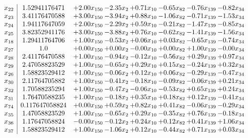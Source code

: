 \documentclass[8pt]{article}
\begin{document}
\[\begin{array}{c| c c@{\hskip 2pt} c@{\hskip 2pt} c@{\hskip 2pt} c@{\hskip 2pt} c@{\hskip 2pt} c@{\hskip 2pt} }
 x_{22}   &  1.52941176471 & +  2.00 x_{150} & -2.35 x_{2} & +  0.71 x_{10} & -0.65 x_{82} & -0.76 x_{139} & -0.82 x_{34}\\
 x_{23}   &  3.41176470588 & +  3.00 x_{150} & -3.94 x_{2} & +  0.88 x_{10} & -1.06 x_{82} & -0.71 x_{139} & -1.53 x_{34}\\
 x_{24}   &  1.94117647059 & +  2.00 x_{150} & -2.29 x_{2} & +  0.59 x_{10} & -0.21 x_{82} & -1.47 x_{139} & -0.85 x_{34}\\
 x_{25}   &  3.82352941176 & +  3.00 x_{150} & -3.88 x_{2} & +  0.76 x_{10} & -0.62 x_{82} & -1.41 x_{139} & -1.56 x_{34}\\
 x_{18}   &  1.29411764706 & +  1.00 x_{150} & -0.53 x_{2} & +  0.06 x_{10} & +  0.03 x_{82} & -0.65 x_{139} & -0.74 x_{34}\\
 x_{27}   &  1.0 & +  0.00 x_{150} & +  0.00 x_{2} & -0.00 x_{10} & +  0.00 x_{82} & +  1.00 x_{139} & -0.00 x_{34}\\
 x_{28}   &  2.41176470588 & +  1.00 x_{150} & -0.94 x_{2} & -0.12 x_{10} & -0.56 x_{82} & +  0.29 x_{139} & +  0.97 x_{34}\\
 x_{29}   &  2.47058823529 & +  1.00 x_{150} & -0.65 x_{2} & +  0.29 x_{10} & +  0.15 x_{82} & -0.24 x_{139} & +  0.32 x_{34}\\
 x_{26}   &  1.58823529412 & +  1.00 x_{150} & -0.06 x_{2} & +  0.12 x_{10} & +  0.06 x_{82} & -0.29 x_{139} & -0.47 x_{34}\\
 x_{30}   &  2.11764705882 & +  1.00 x_{150} & -0.41 x_{2} & -0.18 x_{10} & -0.09 x_{82} & -0.06 x_{139} & +  0.21 x_{34}\\
 x_{32}   &  1.70588235294 & +  1.00 x_{150} & -0.47 x_{2} & -0.06 x_{10} & -0.53 x_{82} & +  0.65 x_{139} & +  0.24 x_{34}\\
 x_{31}   &  1.76470588235 & +  1.00 x_{150} & -0.18 x_{2} & +  0.35 x_{10} & +  0.18 x_{82} & +  0.12 x_{139} & -0.41 x_{34}\\
 x_{74}   &  0.117647058824 & +  0.00 x_{150} & +  0.59 x_{2} & +  0.82 x_{10} & +  0.41 x_{82} & -0.06 x_{139} & -0.29 x_{34}\\
 x_{35}   &  1.47058823529 & +  1.00 x_{150} & -0.65 x_{2} & +  0.29 x_{10} & -0.35 x_{82} & +  0.76 x_{139} & -0.18 x_{34}\\
 x_{36}   &  1.17647058824 & -0.00 x_{150} & -0.12 x_{2} & +  0.24 x_{10} & +  0.12 x_{82} & +  0.41 x_{139} & +  1.06 x_{34}\\
 x_{37}   &  1.58823529412 & +  1.00 x_{150} & -1.06 x_{2} & +  0.12 x_{10} & -0.44 x_{82} & +  0.71 x_{139} & +  0.03 x_{34}\\

\end{array}\]
\end{document}
